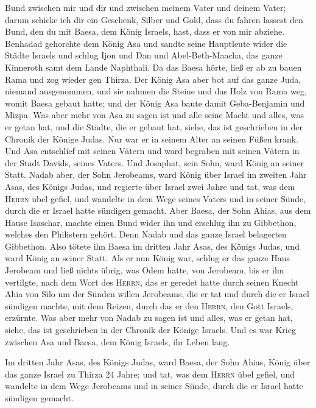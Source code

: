 Bund zwischen mir und dir und zwischen meinem Vater und deinem Vater;
darum schicke ich dir ein Geschenk, Silber und Gold, dass du fahren
lassest den Bund, den du mit Baesa, dem König Israels, hast, dass er von
mir abziehe.  Benhadad gehorchte dem König Asa und sandte
seine Hauptleute wider die Städte Israels und schlug Ijon und Dan und
Abel-Beth-Maacha, das ganze Kinneroth samt dem Lande Naphthali.
 Da das Baesa hörte, ließ er ab zu bauen Rama und zog
wieder gen Thirza.  Der König Asa aber bot auf das ganze
Juda, niemand ausgenommen, und sie nahmen die Steine und das Holz von
Rama weg, womit Baesa gebaut hatte; und der König Asa baute damit
Geba-Benjamin und Mizpa.  Was aber mehr von Asa zu sagen
ist und alle seine Macht und alles, was er getan hat, und die Städte,
die er gebaut hat, siehe, das ist geschrieben in der Chronik der Könige
Judas. Nur war er in seinem Alter an seinen Füßen krank. 
Und Asa entschlief mit seinen Vätern und ward begraben mit seinen Vätern
in der Stadt Davids, seines Vaters. Und Josaphat, sein Sohn, ward König
an seiner Statt.  Nadab aber, der Sohn Jerobeams, ward
König über Israel im zweiten Jahr Asas, des Königs Judas, und regierte
über Israel zwei Jahre  und tat, was dem \textsc{Herrn}
übel gefiel, und wandelte in dem Wege seines Vaters und in seiner Sünde,
durch die er Israel hatte sündigen gemacht.  Aber Baesa,
der Sohn Ahias, aus dem Hause Isaschar, machte einen Bund wider ihn und
erschlug ihn zu Gibbethon, welches den Philistern gehört. Denn Nadab und
das ganze Israel belagerten Gibbethon.  Also tötete ihn
Baesa im dritten Jahr Asas, des Königs Judas, und ward König an seiner
Statt.  Als er nun König war, schlug er das ganze Haus
Jerobeam und ließ nichts übrig, was Odem hatte, von Jerobeam, bis er ihn
vertilgte, nach dem Wort des \textsc{Herrn}, das er geredet hatte durch
seinen Knecht Ahia von Silo  um der Sünden willen
Jerobeams, die er tat und durch die er Israel sündigen machte, mit dem
Reizen, durch das er den \textsc{Herrn}, den Gott Israels, erzürnte.
 Was aber mehr von Nadab zu sagen ist und alles, was er
getan hat, siehe, das ist geschrieben in der Chronik der Könige Israels.
 Und es war Krieg zwischen Asa und Baesa, dem König
Israels, ihr Leben lang.

 Im dritten Jahr Asas, des Königs Judas, ward Baesa, der
Sohn Ahias, König über das ganze Israel zu Thirza 24 Jahre;
 und tat, was dem \textsc{Herrn} übel gefiel, und
wandelte in dem Wege Jerobeams und in seiner Sünde, durch die er Israel
hatte sündigen gemacht.

